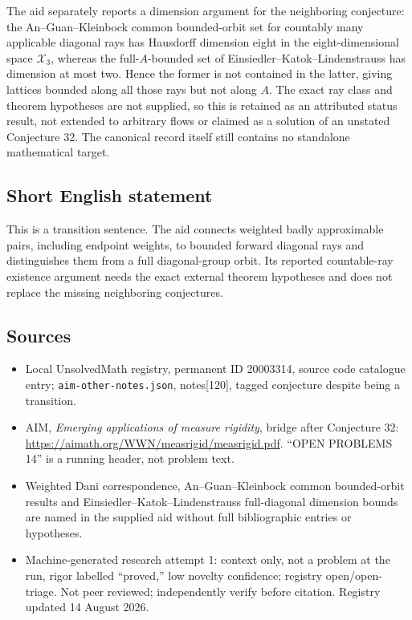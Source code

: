 \documentclass[11pt]{article}
\begin{document}
The aid separately reports a dimension argument for the neighboring conjecture: the An--Guan--Kleinbock common bounded-orbit set for countably many applicable diagonal rays has Hausdorff dimension eight in the eight-dimensional space $\mathcal X_3$, whereas the full-$A$-bounded set of Einsiedler--Katok--Lindenstrauss has dimension at most two. Hence the former is not contained in the latter, giving lattices bounded along all those rays but not along $A$. The exact ray class and theorem hypotheses are not supplied, so this is retained as an attributed status result, not extended to arbitrary flows or claimed as a solution of an unstated Conjecture 32. The canonical record itself still contains no standalone mathematical target.
\subsection{Short English statement}
This is a transition sentence. The aid connects weighted badly approximable pairs, including endpoint weights, to bounded forward diagonal rays and distinguishes them from a full diagonal-group orbit. Its reported countable-ray existence argument needs the exact external theorem hypotheses and does not replace the missing neighboring conjectures.
\subsection{Sources}
\begin{itemize}
\item Local UnsolvedMath registry, permanent ID 20003314, source code catalogue entry; \texttt{aim-other-notes.json}, notes[120], tagged conjecture despite being a transition.
\item AIM, \emph{Emerging applications of measure rigidity}, bridge after Conjecture 32: \url{https://aimath.org/WWN/measrigid/measrigid.pdf}. ``OPEN PROBLEMS 14'' is a running header, not problem text.
\item Weighted Dani correspondence, An--Guan--Kleinbock common bounded-orbit results and Einsiedler--Katok--Lindenstrauss full-diagonal dimension bounds are named in the supplied aid without full bibliographic entries or hypotheses.
\item Machine-generated research attempt 1: context only, not a problem at the run, rigor labelled ``proved,'' low novelty confidence; registry open/open-triage. Not peer reviewed; independently verify before citation. Registry updated 14 August 2026.
\end{itemize}
\end{document}
